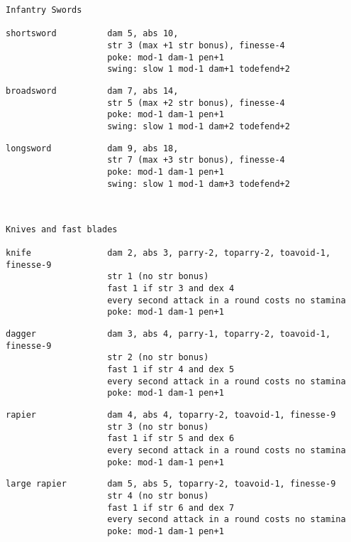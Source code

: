 \goodbreak \small \begin{samepage} \begin{verbatim}
Infantry Swords

shortsword          dam 5, abs 10,
                    str 3 (max +1 str bonus), finesse-4
                    poke: mod-1 dam-1 pen+1
                    swing: slow 1 mod-1 dam+1 todefend+2
\end{verbatim} \blocklistgap \begin{verbatim}
broadsword          dam 7, abs 14,
                    str 5 (max +2 str bonus), finesse-4
                    poke: mod-1 dam-1 pen+1
                    swing: slow 1 mod-1 dam+2 todefend+2
\end{verbatim} \blocklistgap \begin{verbatim}
longsword           dam 9, abs 18,
                    str 7 (max +3 str bonus), finesse-4
                    poke: mod-1 dam-1 pen+1
                    swing: slow 1 mod-1 dam+3 todefend+2
\end{verbatim} \end{samepage} \normalsize \goodbreak

\

\goodbreak \small \begin{samepage} \begin{verbatim}
Knives and fast blades

knife               dam 2, abs 3, parry-2, toparry-2, toavoid-1, finesse-9
                    str 1 (no str bonus)
                    fast 1 if str 3 and dex 4
                    every second attack in a round costs no stamina
                    poke: mod-1 dam-1 pen+1
\end{verbatim} \blocklistgap \begin{verbatim}
dagger              dam 3, abs 4, parry-1, toparry-2, toavoid-1, finesse-9
                    str 2 (no str bonus)
                    fast 1 if str 4 and dex 5
                    every second attack in a round costs no stamina
                    poke: mod-1 dam-1 pen+1
\end{verbatim} \blocklistgap \begin{verbatim}
rapier              dam 4, abs 4, toparry-2, toavoid-1, finesse-9
                    str 3 (no str bonus)
                    fast 1 if str 5 and dex 6
                    every second attack in a round costs no stamina
                    poke: mod-1 dam-1 pen+1
\end{verbatim} \blocklistgap \begin{verbatim}
large rapier        dam 5, abs 5, toparry-2, toavoid-1, finesse-9
                    str 4 (no str bonus)
                    fast 1 if str 6 and dex 7
                    every second attack in a round costs no stamina
                    poke: mod-1 dam-1 pen+1
\end{verbatim} \end{samepage} \normalsize \goodbreak

